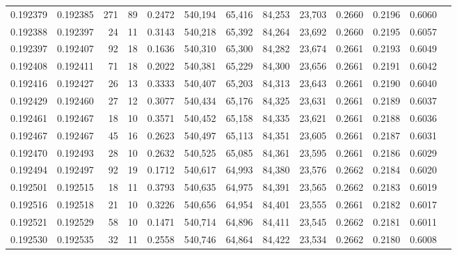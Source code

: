 \begin{tabular}{rrrrrrrrrrrrr}
0.192379 & 0.192385 &   271 &  89 &                                     0.2472 & 540,194 &  65,416 &  84,253 &  23,703 & 0.2660 & 0.2196 & 0.6060 \\
0.192388 & 0.192397 &    24 &  11 &                                     0.3143 & 540,218 &  65,392 &  84,264 &  23,692 & 0.2660 & 0.2195 & 0.6057 \\
0.192397 & 0.192407 &    92 &  18 &                                     0.1636 & 540,310 &  65,300 &  84,282 &  23,674 & 0.2661 & 0.2193 & 0.6049 \\
0.192408 & 0.192411 &    71 &  18 &                                     0.2022 & 540,381 &  65,229 &  84,300 &  23,656 & 0.2661 & 0.2191 & 0.6042 \\
0.192416 & 0.192427 &    26 &  13 &                                     0.3333 & 540,407 &  65,203 &  84,313 &  23,643 & 0.2661 & 0.2190 & 0.6040 \\
0.192429 & 0.192460 &    27 &  12 &                                     0.3077 & 540,434 &  65,176 &  84,325 &  23,631 & 0.2661 & 0.2189 & 0.6037 \\
0.192461 & 0.192467 &    18 &  10 &                                     0.3571 & 540,452 &  65,158 &  84,335 &  23,621 & 0.2661 & 0.2188 & 0.6036 \\
0.192467 & 0.192467 &    45 &  16 &                                     0.2623 & 540,497 &  65,113 &  84,351 &  23,605 & 0.2661 & 0.2187 & 0.6031 \\
0.192470 & 0.192493 &    28 &  10 &                                     0.2632 & 540,525 &  65,085 &  84,361 &  23,595 & 0.2661 & 0.2186 & 0.6029 \\
0.192494 & 0.192497 &    92 &  19 &                                     0.1712 & 540,617 &  64,993 &  84,380 &  23,576 & 0.2662 & 0.2184 & 0.6020 \\
0.192501 & 0.192515 &    18 &  11 &                                     0.3793 & 540,635 &  64,975 &  84,391 &  23,565 & 0.2662 & 0.2183 & 0.6019 \\
0.192516 & 0.192518 &    21 &  10 &                                     0.3226 & 540,656 &  64,954 &  84,401 &  23,555 & 0.2661 & 0.2182 & 0.6017 \\
0.192521 & 0.192529 &    58 &  10 &                                     0.1471 & 540,714 &  64,896 &  84,411 &  23,545 & 0.2662 & 0.2181 & 0.6011 \\
0.192530 & 0.192535 &    32 &  11 &                                     0.2558 & 540,746 &  64,864 &  84,422 &  23,534 & 0.2662 & 0.2180 & 0.6008 \\

\end{tabular}
